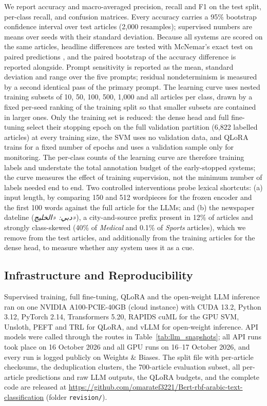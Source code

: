 \documentclass[preprint,12pt,authoryear]{elsarticle}
\newcommand{\RTL}[1]{\foreignlanguage{arabic}{#1}}
\newif\ifrevmarkup
\DeclareRobustCommand{\rev}[1]{\ifrevmarkup{\color{blue}#1}\else#1\fi}
\begin{document}
\rev{We report accuracy and macro-averaged precision, recall and F1 on the test split, per-class recall, and confusion matrices. Every accuracy carries a 95\% bootstrap confidence interval over test articles (2,000 resamples); supervised numbers are means over seeds with their standard deviation. Because all systems are scored on the same articles, headline differences are tested with McNemar's exact test on paired predictions \cite{dietterich1998approximate}, and the paired bootstrap of the accuracy difference is reported alongside. Prompt sensitivity is reported as the mean, standard deviation and range over the five prompts; residual nondeterminism is measured by a second identical pass of the primary prompt. The learning curve uses nested training subsets of 10, 50, 100, 500, 1,000 and all articles per class, drawn by a fixed per-seed ranking of the training split so that smaller subsets are contained in larger ones. Only the training set is reduced: the dense head and full fine-tuning select their stopping epoch on the full validation partition (6,822 labelled articles) at every training size, the SVM uses no validation data, and QLoRA trains for a fixed number of epochs and uses a validation sample only for monitoring. The per-class counts of the learning curve are therefore training labels and understate the total annotation budget of the early-stopped systems; the curve measures the effect of training supervision, not the minimum number of labels needed end to end. Two controlled interventions probe lexical shortcuts: (a) input length, by comparing 150 and 512 wordpieces for the frozen encoder and the first 100 words against the full article for the LLMs; and (b) the newspaper dateline (\textit{\RTL{دبي: «الخليج»}}), a city-and-source prefix present in 12\% of articles and strongly class-skewed (40\% of \textit{Medical} and 0.1\% of \textit{Sports} articles), which we remove from the test articles, and additionally from the training articles for the dense head, to measure whether any system uses it as a cue.}

\subsection{\rev{Infrastructure and Reproducibility}}
\label{infrastructure}

\rev{Supervised training, full fine-tuning, QLoRA and the open-weight LLM inference ran on one NVIDIA A100-PCIE-40GB (cloud instance) with CUDA 13.2, Python 3.12, PyTorch 2.14, Transformers 5.20, RAPIDS cuML for the GPU SVM, Unsloth, PEFT and TRL for QLoRA, and vLLM for open-weight inference. API models were called through the routes in Table~\ref{tab:llm_snapshots}; all API runs took place on 16 October 2026 and all GPU runs on 16--17 October 2026, and every run is logged publicly on Weights \& Biases. The split file with per-article checksums, the deduplication clusters, the 700-article evaluation subset, all per-article predictions and raw LLM outputs, the QLoRA budgets, and the complete code are released at \url{https://github.com/omaratef3221/Bert-rbf-arabic-text-classification} (folder \texttt{revision/}).}
\end{document}
